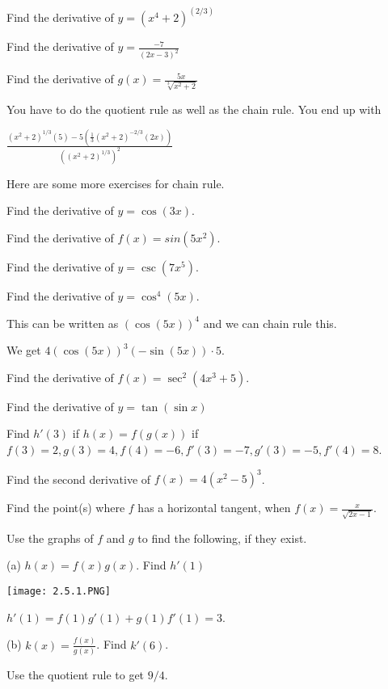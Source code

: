 \documentclass[../bccalc.tex]{subfiles}
\begin{document}
\ex Find the derivative of $y=(x^4+2)^(2/3)$

\ex Find the derivative of $y=\frac{-7}{(2x-3)^2}$

\begin{example}
    Find the derivative of $g(x)=\frac{5x}{\sqrt[3]{x^2+2}}$

    You have to do the quotient rule as well as the chain rule.  You end up with 

    $\frac{(x^2+2)^{1/3}(5)-5(\frac{1}{3}(x^2+2)^{-2/3}(2x))}{((x^2+2)^{1/3})^2}$
\end{example}

Here are some more exercises for chain rule.

\ex Find the derivative of $y=\cos(3x)$.

\ex Find the derivative of $f(x)=sin(5x^2)$.

\ex Find the derivative of $y=\csc(7x^5)$.

\begin{example}
    Find the derivative of $y=\cos^4 (5x)$.

    This can be written as $(\cos(5x))^4$ and we can chain rule this.

    We get $4(\cos(5x))^3(-\sin(5x))\cdot 5$.
\end{example}

\ex Find the derivative of $f(x)=\sec^2 (4x^3+5)$.

\ex Find the derivative of $y=\tan(\sin x)$

\ex Find $h'(3)$ if $h(x)=f(g(x))$ if $f(3)=2, g(3)=4, f(4)=-6, f'(3)=-7, g'(3)=-5, f'(4)=8$.

\ex Find the second derivative of $f(x)=4(x^2-5)^3$.

\ex Find the point(s) where $f$ has a horizontal tangent, when $f(x)=\frac{x}{\sqrt{2x-1}}$.

\pagebreak
\begin{example}
    Use the graphs of $f$ and $g$ to find the following, if they exist.

    (a) $h(x)=f(x)g(x)$. Find $h'(1)$
    \begin{center}
        \texttt{[image: 2.5.1.PNG]}
    \end{center}

    $h'(1)=f(1)g'(1)+g(1)f'(1) = 3$.

    (b) $k(x)=\frac{f(x)}{g(x)}$. Find $k'(6)$.

    Use the quotient rule to get $9/4$.
\end{example}
\end{document}
